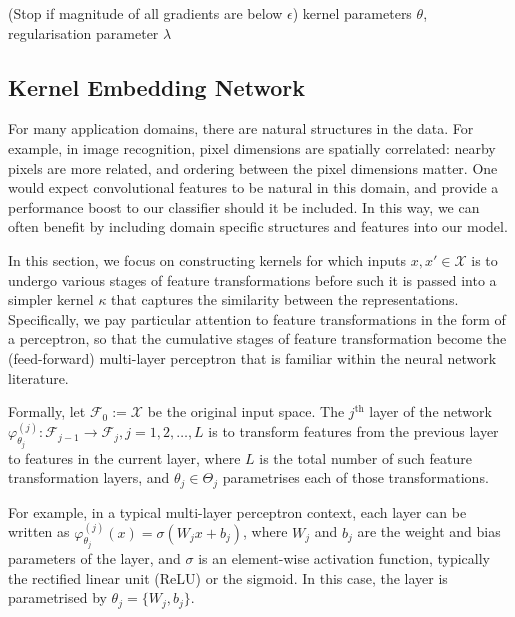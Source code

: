\documentclass{article}
\numberwithin{equation}{section}
\numberwithin{table}{section}
\numberwithin{algorithm}{section}
\begin{document}
\begin{algorithm}[tb]
\begin{algorithmic}[1]
				 \hspace{\fill} (Stop if magnitude of all gradients are below $\epsilon$)
				 kernel parameters $\theta$, regularisation parameter $\lambda$
			\end{algorithmic}
		\end{algorithm}

	\subsection{Kernel Embedding Network}
	\label{app:kernel_embedding_network}
	
		For many application domains, there are natural structures in the data. For example, in image recognition, pixel dimensions are spatially correlated: nearby pixels are more related, and ordering between the pixel dimensions matter. One would expect convolutional features \citep{lecun1998gradient} to be natural in this domain, and provide a performance boost to our classifier should it be included. In this way, we can often benefit by including domain specific structures and features into our model.

		In this section, we focus on constructing kernels for which inputs $x, x' \in \mathcal{X}$ is to undergo various stages of feature transformations before such it is passed into a simpler kernel $\kappa$ that captures the similarity between the representations. Specifically, we pay particular attention to feature transformations in the form of a perceptron, so that the cumulative stages of feature transformation become the (feed-forward) multi-layer perceptron that is familiar within the neural network literature.
	
		Formally, let $\mathcal{F}_{0} := \mathcal{X}$ be the original input space. The $j^{\mathrm{th}}$ layer of the network $\varphi^{(j)}_{\theta_{j}} : \mathcal{F}_{j - 1} \to \mathcal{F}_{j}, j = 1, 2, \dots, L$ is to transform features from the previous layer to features in the current layer, where $L$ is the total number of such feature transformation layers, and $\theta_{j} \in \Theta_{j}$ parametrises each of those transformations.
		
		For example, in a typical multi-layer perceptron context, each layer can be written as $\varphi^{(j)}_{\theta_{j}}(x) = \sigma(W_{j} x + b_{j})$, where $W_{j}$ and $b_{j}$ are the weight and bias parameters of the layer, and $\sigma$ is an element-wise activation function, typically the rectified linear unit (ReLU) or the sigmoid. In this case, the layer is parametrised by $\theta_{j} = \{W_{j}, b_{j}\}$.
		
\end{document}
